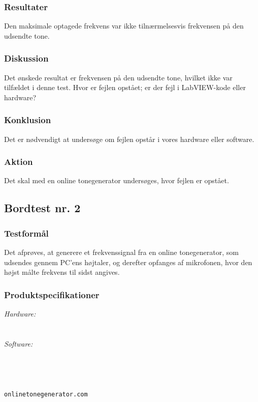 {			\subsubsection{Resultater}
			Den maksimale optagede frekvens var ikke tilnærmelsesvis frekvensen på den udsendte tone.
			\subsubsection{Diskussion}
			Det ønskede resultat er frekvensen på den udsendte tone, hvilket ikke var tilfældet i denne test. Hvor er fejlen opstået; er der fejl i LabVIEW-kode eller hardware? 
			\subsubsection{Konklusion}
			Det er nødvendigt at undersøge om fejlen opstår i vores hardware eller software. 
			\subsubsection{Aktion}
			Det skal med en online tonegenerator undersøges, hvor fejlen er opstået. 

	\subsection{Bordtest nr. 2} %
		\subsubsection{Testformål}
		Det afprøves, at generere et frekvenssignal fra en online tonegenerator, som udsendes gennem PC'ens højtaler, og derefter opfanges af mikrofonen, hvor den højst målte frekvens til sidst angives.  
		
		\subsubsection{Produktspecifikationer}
		
		\textit{Hardware:}\\
		\mikrofon\\
		\PC\\
	
		\textit{Software:}\\
		\labview\\
		\visa\\
		\vi\\
		\ardsw\\
		\texttt{onlinetonegenerator.com}
		
}
